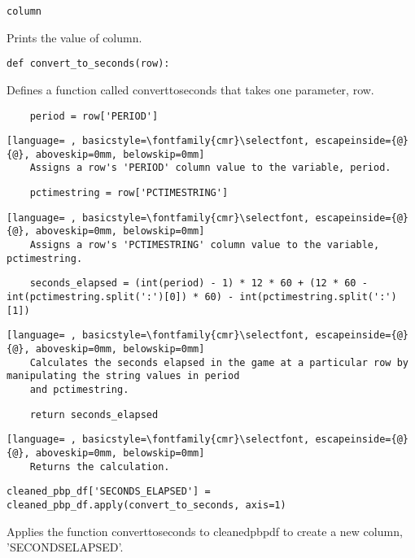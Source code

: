 \documentclass{article}
\begin{document}
\begin{lstlisting}
column
\end{lstlisting}
Prints the value of column.
\begin{lstlisting}
def convert_to_seconds(row):
\end{lstlisting}
Defines a function called convert\textunderscore to\textunderscore seconds that takes one parameter, row.
\begin{lstlisting}
    period = row['PERIOD']
\end{lstlisting}
\begin{lstlisting}[language= , basicstyle=\fontfamily{cmr}\selectfont, escapeinside={@}{@}, aboveskip=0mm, belowskip=0mm]
    Assigns a row's 'PERIOD' column value to the variable, period.
\end{lstlisting}
\begin{lstlisting}
    pctimestring = row['PCTIMESTRING']
\end{lstlisting}
\begin{lstlisting}[language= , basicstyle=\fontfamily{cmr}\selectfont, escapeinside={@}{@}, aboveskip=0mm, belowskip=0mm]
    Assigns a row's 'PCTIMESTRING' column value to the variable, pctimestring.
\end{lstlisting}
\begin{lstlisting}
    seconds_elapsed = (int(period) - 1) * 12 * 60 + (12 * 60 - int(pctimestring.split(':')[0]) * 60) - int(pctimestring.split(':')[1])
\end{lstlisting}
\begin{lstlisting}[language= , basicstyle=\fontfamily{cmr}\selectfont, escapeinside={@}{@}, aboveskip=0mm, belowskip=0mm]
    Calculates the seconds elapsed in the game at a particular row by manipulating the string values in period
    and pctimestring.
\end{lstlisting}
\begin{lstlisting}
    return seconds_elapsed
\end{lstlisting}
\begin{lstlisting}[language= , basicstyle=\fontfamily{cmr}\selectfont, escapeinside={@}{@}, aboveskip=0mm, belowskip=0mm]
    Returns the calculation.
\end{lstlisting}
\begin{lstlisting}
cleaned_pbp_df['SECONDS_ELAPSED'] = cleaned_pbp_df.apply(convert_to_seconds, axis=1)
\end{lstlisting}
Applies the function convert\textunderscore to\textunderscore seconds to cleaned\textunderscore pbp\textunderscore df to create a new column, 'SECONDS\textunderscore ELAPSED'.
\end{document}
